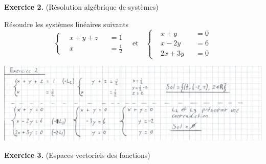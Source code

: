 \documentclass[a4paper, 10pt]{report}
\begin{document}
	\fancyhf{}
	\renewcommand{\headrule}
		{\rule{\textwidth}{0pt}}
	
	\noindent
	\textbf{Exercice 2.} (Résolution algébrique de systèmes)
	
	\indent Résoudre les systèmes linéaires suivants
	\[
		\left\{
		\begin{aligned}
			&x + y + z &&= 1\\
			&x &&= \frac{1}{2}
		\end{aligned}
		\right.
		\quad \text{et} \quad
		\left\{
		\begin{aligned}
			&x + y &&= 0\\
			&x - 2y &&= 6\\
			&2x + 3y &&= 0
		\end{aligned}
		\right.
	\]
	
	\includegraphics{ex02.png}

	\vspace{5mm}
	\noindent
	\textbf{Exercice 3.} (Espaces vectoriels des fonctions)
	
\end{document}
